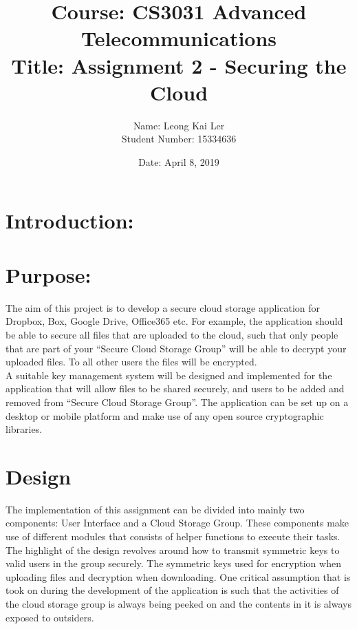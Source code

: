 \documentclass[12pt]{article}
\makeatletter
\renewcommand{\maketitle}{\bgroup\setlength{\parindent}{0pt}
\begin{flushleft}
  \textbf{\@title}

  \@author
  \@date
\end{flushleft}\egroup
}
\makeatother
\begin{document}
\title{\large Course: CS3031 Advanced Telecommunications \\ \normalsize Title: Assignment 2 - Securing the Cloud }
\author{Name: Leong Kai Ler \\ Student Number: 15334636 \\   }
\date{Date: April 8, 2019}
\maketitle

\section*{Introduction:}


\section*{Purpose:}
The aim of this project is to develop a secure cloud storage application for Dropbox, Box, Google Drive, Office365 etc. For example, the application should be able to secure all files that are uploaded to the cloud, such that only people that are part of your “Secure Cloud Storage Group” will be able to decrypt your uploaded files. To all other users the files will be encrypted. \\ 

A suitable key management system will be designed and implemented for the application that will allow files to be shared securely, and users to be added and removed from “Secure Cloud Storage Group”. The application can be set up on a desktop or mobile platform and make use of any open source cryptographic libraries.
\newpage
\section*{Design}
The implementation of this assignment can be divided into mainly two components: User Interface and a Cloud Storage Group. These components make use of different modules that consists of helper functions to execute their tasks. \\

The highlight of the design revolves around how to transmit symmetric keys to valid users in the group securely. The symmetric keys used for encryption when uploading files and decryption when downloading. One critical assumption that is took on during the development of the application is such that the activities of the cloud storage group is always being peeked on and the contents in it is always exposed to outsiders. \\
\end{document}
